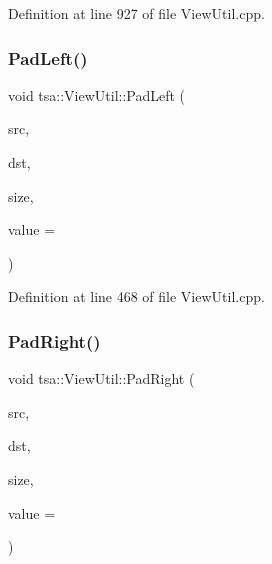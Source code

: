 Definition at line 927 of file View\+Util.\+cpp.

\mbox{\label{classtsa_1_1_view_util_a98044d73147e95de0cd82fd4e131d3ca}} 
\subsubsection{\texorpdfstring{Pad\+Left()}{PadLeft()}}
{\footnotesize\ttfamily void tsa\+::\+View\+Util\+::\+Pad\+Left (\begin{DoxyParamCaption}\item[{\hyperlink{namespacetsa_ac599574bcc094eda25613724b8f3ca9e}{Seq\+View\+Double} \&}]{src,  }\item[{\hyperlink{namespacetsa_ac599574bcc094eda25613724b8f3ca9e}{Seq\+View\+Double} \&}]{dst,  }\item[{unsigned int}]{size,  }\item[{double}]{value = {} }\end{DoxyParamCaption})\hspace{0.3cm}{\ttfamily [static]}}



Definition at line 468 of file View\+Util.\+cpp.

\mbox{\label{classtsa_1_1_view_util_a8593e792009543c7d21af6bdeea8f3d3}} 
\subsubsection{\texorpdfstring{Pad\+Right()}{PadRight()}}
{\footnotesize\ttfamily void tsa\+::\+View\+Util\+::\+Pad\+Right (\begin{DoxyParamCaption}\item[{\hyperlink{namespacetsa_ac599574bcc094eda25613724b8f3ca9e}{Seq\+View\+Double} \&}]{src,  }\item[{\hyperlink{namespacetsa_ac599574bcc094eda25613724b8f3ca9e}{Seq\+View\+Double} \&}]{dst,  }\item[{unsigned int}]{size,  }\item[{double}]{value = {} }\end{DoxyParamCaption})\hspace{0.3cm}{\ttfamily [static]}}




